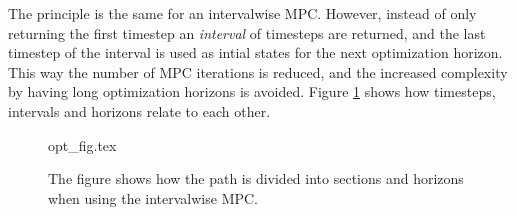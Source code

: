 The principle is the same for an intervalwise MPC. However, instead of only returning the first timestep an \textit{interval} of timesteps are returned, and the last timestep of the interval is used as intial states for the next optimization horizon. This way the number of MPC iterations is reduced, and the increased complexity by having long optimization horizons is avoided. Figure \ref{fig:opt_fig} shows how timesteps, intervals and horizons relate to each other.

\begin{figure}
	{opt_fig.tex}
	\caption{The figure shows how the path is divided into sections and horizons when using the intervalwise MPC.}
	\label{fig:opt_fig}
\end{figure}